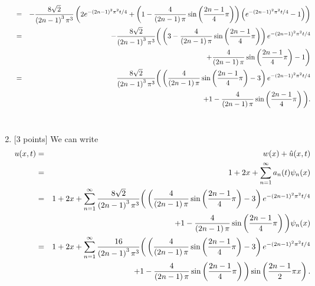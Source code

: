 \begin{solution}
\begin{enumerate}
\begin{eqnarray*}
&=&-{8\sqrt{2}\over\left(2n-1\right)^3\pi^3}\left(2e^{-\left(2n-1\right)^2\pi^2t/4}+\left(1-{4\over \left(2n-1\right)\pi}\sin\left({2n-1\over 4}\pi\right)\right)\left(e^{-\left(2n-1\right)^2\pi^2t/4}-1\right)\right)
\\
&=&-{8\sqrt{2}\over\left(2n-1\right)^3\pi^3}\bigg{(}\left(3-{4\over \left(2n-1\right)\pi}\sin\left({2n-1\over 4}\pi\right)\right)e^{-\left(2n-1\right)^2\pi^2t/4}
\\
&&+{4\over \left(2n-1\right)\pi}\sin\left({2n-1\over 4}\pi\right)-1\bigg{)}
\\
&=&{8\sqrt{2}\over\left(2n-1\right)^3\pi^3}\bigg{(}\left({4\over \left(2n-1\right)\pi}\sin\left({2n-1\over 4}\pi\right)-3\right)e^{-\left(2n-1\right)^2\pi^2t/4}
\\
&&+1-{4\over \left(2n-1\right)\pi}\sin\left({2n-1\over 4}\pi\right)\bigg{)}.
\end{eqnarray*}
\\
\item {[3 points]} We can write
\begin{eqnarray*}
u(x,t) &=& w(x)+\hat{u}(x,t)
\\
&=& 1+2x+\sum_{n=1}^\infty a_n(t) \psi_n(x)
\\
&=& 1+2x+\sum_{n=1}^\infty {8\sqrt{2}\over\left(2n-1\right)^3\pi^3}\bigg{(}\left({4\over \left(2n-1\right)\pi}\sin\left({2n-1\over 4}\pi\right)-3\right)e^{-\left(2n-1\right)^2\pi^2t/4}
\\
&&+1-{4\over \left(2n-1\right)\pi}\sin\left({2n-1\over 4}\pi\right)\bigg{)} \psi_n(x)
\\
&=& 1+2x+\sum_{n=1}^\infty {16\over\left(2n-1\right)^3\pi^3}\bigg{(}\left({4\over \left(2n-1\right)\pi}\sin\left({2n-1\over 4}\pi\right)-3\right)e^{-\left(2n-1\right)^2\pi^2t/4}
\\
&&+1-{4\over \left(2n-1\right)\pi}\sin\left({2n-1\over 4}\pi\right)\bigg{)}\sin\left({2n-1\over 2} \pi x\right).
\end{eqnarray*}
\end{enumerate}
\end{solution}